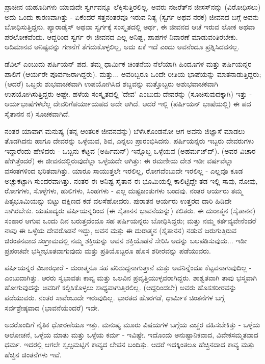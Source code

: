 ಪ್ರಾಚೀನ ಯಹೂದಿಗಳು ಯಾವುದೇ ಸ್ವರ್ಗವನ್ನೂ ಲೆಕ್ಕಿಸುತ್ತಿರಲಿಲ್ಲ. ಅವರು ನಜರೆತ್‌ನ ಜೀಸಸ್‌ನನ್ನು (ವಿರೋಧಿಸಲು) ಅದು ಒಂದು ಕಾರಣವಾಗಿತ್ತು - ಏಕೆಂದರೆ ಸತ್ತನಂತರವೂ ಇರುವ ನಿತ್ಯ (ಸ್ವರ್ಗ ಅಥವ ನರಕ) ಜೀವನದ ಬಗ್ಗೆ ಅವನು ಬೋಧಿಸುತ್ತಿದ್ದನು. ಪ್ಯಾರಾಡೈಸ್ ಅಥವಾ ಸ್ವರ್ಗಕ್ಕೆ ಸಂಸ್ಕೃತದಲ್ಲಿ ಅರ್ಥ, ಈ ಜೀವನದ ಆಚೆ ಇರುವ ಲೋಕ ಅಥವಾ ಪರಲೋಕವೆಂದು. ಆದ್ದರಿಂದ ಸ್ವರ್ಗ ಈ ಜೀವನದ ಎಲ್ಲ ಅನಿಷ್ಟ, ಪಾಪಗಳ ನಿವಾರಣೆ ಮಾಡುವಂತಿರಬೇಕು. ಆದಿಮಾನವ ಅನಿಷ್ಟವನ್ನು ಗಣನೆಗೆ ತೆಗೆದುಕೊಳ್ಳಲಿಲ್ಲ, ಅದು ಏಕೆ ಇದೆ ಎಂದು ಅವನೆಂದೂ ಪ್ರಶ್ನಿಸಿದವನಲ್ಲ.

ಡೆವಿಲ್ ಎಂಬುದು ಪರ್ಷಿಯನ್ ಪದ. ತಮ್ಮ ಧಾರ್ಮಿಕ ಚಿಂತನೆಯ ನೆಲೆಯಾಗಿ ಹಿಂದೂಗಳ ಮತ್ತು ಪರ್ಷಿಯನ್ನರ ಪಾಲಿಗೆ (ಆರ್ಯರೇ ಪೂರ್ವಜರಾಗಿದ್ದರು). ಮತ್ತು... ಅವರಿಬ್ಬರೂ ಒಂದೇ ರೀತಿಯ ಭಾಷೆಯನ್ನು ಮಾತನಾಡುತ್ತಿದ್ದರು; (ಆದರೆ) ಒಬ್ಬರು ಶುಭವಾಚಕವಾಗಿ ಉಪಯೋಗಿಸಿದ ಶಬ್ದವನ್ನು ಮತ್ತೊಬ್ಬರು ಅಶುಭವಾಚಕವಾಗಿ ಉಪಯೋಗಿಸುತ್ತಿದ್ದರು ಅಷ್ಟೇ. ಹಳೆಯ ಸಂಸ್ಕೃತದಲ್ಲಿ 'ದೇವ' ಎಂಬುದು ದೇವರನ್ನು (ಸೂಚಿಸುವುದಕ್ಕಾಗಿ) ಇತ್ತು - ಆರ್ಯಭಾಷೆಗಳಲೆಲ್ಲ ದೇವರಿಗೆ\break ಪರ್ಯಾಯಪದ ಅದೇ ಆಗಿದೆ. ಆದರೆ ಇಲ್ಲಿ (ಪರ್ಷಿಯನ್ ಭಾಷೆಯಲ್ಲಿ) ಈ ಪದ ಸೈತಾನನ ನ) ಸೂಚಕವಾಗಿದೆ.

ನಂತರ ಯಾವಾಗ ಮನುಷ್ಯ (ತನ್ನ ಆಂತರಿಕ ಜೀವನವನ್ನು) ಬೆಳೆಸಿಕೊಂಡನೋ ಆಗ ಅವನು ಜಿಜ್ಞಾಸೆ ಮಾಡಲು ತೊಡಗಿದನು ಹಾಗೂ ದೇವರನ್ನು ಒಳ್ಳೆಯವ, ಶಿವ, ಎನ್ನಲು ಪ್ರಾರಂಭಿಸಿದನು. ಪರ್ಷಿಯನ್ನರು ಇಬ್ಬರು ದೇವರುಗಳು ಇದ್ದಾರೆಂದು ಹೇಳಿದರು - ಒಬ್ಬನು ಕೆಟ್ಟವ (ಅರ್ಹಿಮನ್‌) ಇನ್ನೊಬ್ಬ ಒಳ್ಳೆಯವ (ಅಹರ್ಮಜ್‌ದ್). (ಅವರ ವಿಚಾರ ಹೇಗಿತ್ತೆಂದರೆ) ಈ ಜೀವನದಲ್ಲಿರುವುದೆಲ್ಲಾ ಒಳ್ಳೆಯದೇ ಆಗಿತ್ತು: ಈ ರಮಣೀಯ ದೇಶ ಇಡೀ ವರ್ಷವೆಲ್ಲಾ ವಸಂತಗಳಿಂದ ಭರಿತವಾಗಿತ್ತು. ಯಾರೂ ಸಾಯುತ್ತಲೇ ಇರಲಿಲ್ಲ, ರೋಗವೆಂಬುದೇ ಇರಲಿಲ್ಲ - ಎಲ್ಲವೂ ಕೂಡ ಅಚ್ಚುಕಟ್ಟಾಗಿ ಸುಂದರವಾಗಿತ್ತು. ನಂತರ ಈ ಅನಿಷ್ಟ ಸೈತಾನ ಈ ಭೂಮಿಯಲ್ಲಿ ಕಾಲಿಟ್ಟಿದ್ದೇ ತಡ ಇಲ್ಲಿ ಸಾವು, ನೋವು, ರೋಗಗಳು, ಸೊಳ್ಳೆಗಳು, ಹುಲಿಗಳು, ಸಿಂಹಗಳು - ಎಲ್ಲ ದುಷ್ಟಜಂತುಗಳು ಬಂದವು. ನಂತರ ಆರ್ಯರು ತಮ್ಮ ಪಿತೃಭೂಮಿಯನ್ನು ಬಿಟ್ಟು ದಕ್ಷಿಣದ ಕಡೆ ವಲಸೆಹೋದರು. ಪುರಾತನ ಆರ್ಯರು ಉತ್ತರದ ದಾರಿ ಹಿಡಿದೇ ಸಾಗಿರಬೇಕು. ಯಹೂದ್ಯರು ಪರ್ಷಿಯನ್ನರಿಂದ (ಈ ಸೈತಾನನ ಭಾವನೆಯನ್ನು) ಕಲಿತರು. ಈ ದುರಾತ್ಮನ (ಸೈತಾನನ) ಸಂಹಾರ ಆಗುವ ಒಂದು ದಿನ ಬರುತ್ತದೆಂದೂ ಸಹ ಪರ್ಷಿಯನ್ನರು ಬೋಧಿಸಿದ್ದರು; ಮತ್ತು ನಮ್ಮ ಕರ್ತವ್ಯವೇನೆಂದರೆ ನಾವು ಈ ಒಳ್ಳೆಯ ದೇವರೊಡನೆ ಇದ್ದು, ಅವನ ಮತ್ತು ಈ ದುರಾತ್ಮನ (ಸೈತಾನನ) ನಡುವೆ ಜರುಗುತ್ತಿರುವ ಚಿರಂತನವಾದ ಸಂಗ್ರಾಮದಲ್ಲಿ ನಮ್ಮ ಶಕ್ತಿಯನ್ನು ಅವನ ಶಕ್ತಿಯೊಡನೆ ಸೇರಿಸಿ ಅದನ್ನು ಬಲಪಡಿಸುವುದು... ಇಡೀ ಪ್ರಪಂಚವೇ ಭಸ್ಮೀಭೂತವಾಗುವುದು ಮತ್ತು ಪ್ರತಿಯೊಬ್ಬರೂ ಹೊಸ ಶರೀರವನ್ನು ಪಡೆಯುವರು.

ಪರ್ಷಿಯನ್ನರ ವಿಚಾರಧಾರೆ - ದುರಾತ್ಮನೂ ಸಹ ಪರಿಶುದ್ದನಾಗುತ್ತಾನೆ ಮತ್ತು ಅವನಿನ್ನೆಂದೂ ಕೆಟ್ಟವನಾಗುವುದಿಲ್ಲ - ಎಂಬುದಾಗಿತ್ತು. ಆರರು ಸ್ವಭಾವತಃ ಕಾವ್ಯ ಮತ್ತು ಒಲವಿನ ಪ್ರವೃತ್ತಿಯುಳ್ಳವರಾಗಿದ್ದರು. ಶಾಶ್ವತವಾಗಿ ತಾವು ಭಸ್ಮವಾಗಿ ಹೋಗುವುದನ್ನು ಅವರಿಗೆ ಕಲ್ಪಿಸಿಕೊಳ್ಳಲು ಸಾಧ್ಯವಾಗುತ್ತಿರಲಿಲ್ಲ. (ಆದ್ದರಿಂದಲೇ) ಅವರು ಹೊಸ\break ಶರೀರವನ್ನು ಪಡೆಯುವರು. ನಂತರ ಸಾವೆಂಬುದೇ ಇರುವುದಿಲ್ಲ. ಭಾರತದ ಹೊರಗಡೆ, ಧಾರ್ಮಿಕ ಚಿಂತನೆಗಳ ಬಗ್ಗೆ ಸರ್ವಶ್ರೇಷ್ಠವಾದ (ಭಾವನೆಯೆಂದರೆ) ಇದೇ.

ಅದರೊಂದಿಗೆ ನೈತಿಕ ಧೋರಣೆಯೂ ಇತ್ತು. ಮನುಷ್ಯ ಮೂರು ವಿಷಯಗಳ ಬಗ್ಗೆಯ ಎಚ್ಚರ ವಹಿಸಬೇಕಿತ್ತು - ಒಳ್ಳೆಯ ಆಲೋಚನೆ, ಒಳ್ಳೆಯ ಮಾತು ಮತ್ತು ಒಳ್ಳೆಯ ಕರ್ಮ - ಇವಿಷ್ಟೇ. ಇದೊಂದು ಅನುಷ್ಟಾನಿಕವಾದ, ವಿವೇಕಸಮ್ಮತವಾದ ಧರ್ಮ. ಇದರಲ್ಲಿ ಆಗಲೇ ಸ್ವಲ್ಪಮಟ್ಟಿಗೆ ಕಾವ್ಯದ ಲೇಪನ ಬಂದಿತ್ತು. ಆದರೆ ಇದಕ್ಕಿಂತಲೂ ಹೆಚ್ಚಿನದಾದ ಕಾವ್ಯ ಮತ್ತು ಹೆಚ್ಚಿನ ಚಿಂತನೆಗಳು ಇವೆ.

